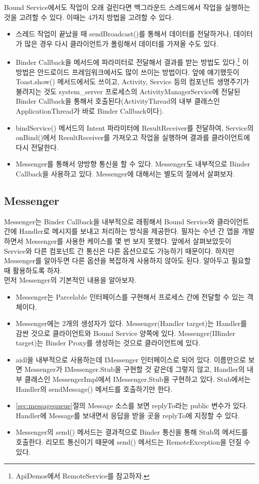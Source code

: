 Bound Service에서도 작업이 오래 걸린다면 백그라운드 스레드에서 작업을 실행하는 것을 고려할 수 있다. 이때는 4가지 방법을 고려할 수 있다.
\begin{itemize}
\item 스레드 작업이 끝났을 때 sendBroadcast()를 통해서 데이터를 전달하거나, 데이터가 많은 경우 다시 클라이언트가 폴링해서 데이터를 가져올 수도 있다.
\item Binder Callback을 메서드에 파라미터로 전달해서 결과를 받는 방법도 있다.\footnote{ApiDemos에서 RemoteService를 참고하자.} 이 방법은 안드로이드 프레임워크에서도 많이 쓰이는 방법이다. 앞에 얘기했듯이 Toast.show() 메서드에서도 쓰이고, Activity, Service 등의 컴포넌트 생명주기가 불려지는 것도 system\_server 프로세스의 ActivityManagerService에 전달된 Binder Callback을 통해서 호출된다(ActivityThread의 내부 클래스인 ApplicationThread가 바로 Binder Callback이다).
\item bindService() 메서드의 Intent 파라미터에 ResultReceiver를 전달하여, Service의 onBind()에서 ResultReceiver를 가져오고 작업을 실행하며 결과를 클라이언트에 다시 전달한다.
\item Messenger를 통해서 양방향 통신을 할 수 있다. Messenger도 내부적으로 Binder Callback을 사용하고 있다. Messenger에 대해서는 별도의 절에서 살펴보자.
\end{itemize}

\subsection{Messenger}
\label{subsec:messenger}
Messenger는 Binder Callback을 내부적으로 래핑해서 Bound Service와 클라이언트 간에 Handler로 메시지를 보내고 처리하는 방식을 제공한다.
필자는 수년 간 앱을 개발하면서 Messenger를 사용한 케이스를 몇 번 보지 못했다. 
앞에서 살펴보았듯이 Service와 다른 컴포넌트 간 통신은 다른 옵션으로도 가능하기 때문이다. 
하지만 Messenger를 알아두면 다른 옵션을 복잡하게 사용하지 않아도 된다. 알아두고 필요할 때 활용하도록 하자.\\

먼저 Messenger의 기본적인 내용을 알아보자. 
\begin{itemize}
\item Messenger는 Parcelable 인터페이스를 구현해서 프로세스 간에 전달할 수 있는 객체이다.
\item Messenger에는 2개의 생성자가 있다. Messenger(Handler target)는 Handler를 감싼 것으로 클라이언트와 Bound Service 양쪽에 있다. Messenger(IBinder target)는 Binder Proxy를 생성하는 것으로 클라이언트에 있다.
\item aidl을 내부적으로 사용하는데 IMessenger 인터페이스로 되어 있다. 
이름만으로 보면 Messenger가 IMessenger.Stub을 구현할 것 같은데 그렇지 않고, Handler의 내부 클래스인 MessengerImpl에서 IMessenger.Stub을 구현하고 있다. Stub에서는 Handler의 sendMessage() 메서드를 호출하기만 한다.
\item \ref{sec:messagequeue}절의 Message 소스를 보면 replyTo라는 public 변수가 있다. Handler에 Message를 보내면서 응답을 받을 곳을 replyTo에 지정할 수 있다.
\item Messenger의 send() 메서드는 결과적으로 Binder 통신을 통해 Stub의 메서드를 호출한다. 리모트 통신이기 때문에 send() 메서드는 RemoteException을 던질 수 있다. 
\end{itemize}

